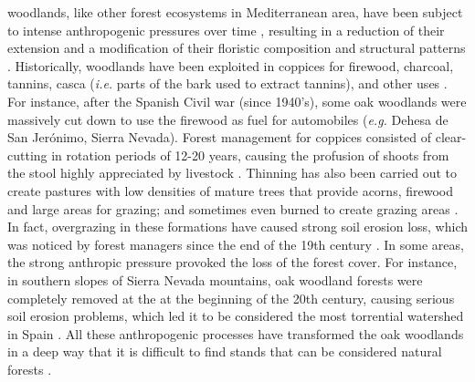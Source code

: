 \Qp woodlands, like other forest ecosystems in Mediterranean area, have been subject to intense anthropogenic pressures over time \autocite{GarciaJimenez20099230Robledales}, resulting in a reduction of their extension and a modification of their floristic composition \autocites{Serradaetal1992CoppiceSystem,Gavilanetal2000EffectsDisturbance,PerezLuqueetal2021EcologicalDiversity} and structural patterns \autocites{Calvoetal1999PostfireSuccession,Tarregaetal2006ForestStructure}. Historically, \Qp woodlands have been exploited in coppices for firewood, charcoal, tannins, casca (\emph{i.e.} parts of the bark used to extract tannins), and other uses \autocites{RuizdelaTorre2006FloraMayor,SanchezPalomaresetal2008EstacionesEcologicas}. For instance, after the Spanish Civil war (since 1940's), some oak woodlands were massively cut down to use the firewood as fuel for automobiles (\emph{e.g.} Dehesa de San Jerónimo, Sierra Nevada)\autocite{Prieto1975BosquesSierra}. Forest management for \Qp coppices consisted of clear-cutting in rotation periods of 12-20 years, causing the profusion of shoots from the stool highly appreciated by livestock \autocite{Bravoetal2008SelviculturaMontes}. Thinning has also been carried out to create pastures with low densities of mature trees that provide acorns, firewood and large areas for grazing; and sometimes even burned to create grazing areas \autocites{HerreraCalvo2016UsoPastoral,Alvarezetal2009CambiosEstructura,ValbuenaCarabanaGil2017CentenaryCoppicing}. In fact, overgrazing in these formations have caused strong soil erosion loss, which was noticed by forest managers since the end of the 19th century \autocites{Laguna1872ComisionFlora}. In some areas, the strong anthropic pressure provoked the loss of the forest cover. For instance, in southern slopes of Sierra Nevada mountains, oak woodland forests were completely removed at the at the beginning of the 20th century, causing serious soil erosion problems, which led it to be considered the most torrential watershed in Spain \autocites{RomeroZurbano1909DivisionHidrologicoforestal}. All these anthropogenic processes have transformed the oak woodlands in a deep way that it is difficult to find stands that can be considered natural forests \autocites{RuizdelaTorre2006FloraMayor}. 
  
